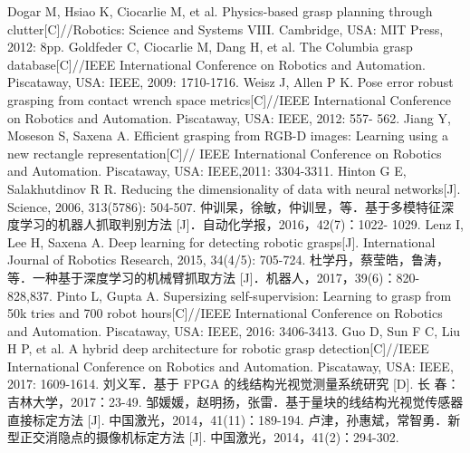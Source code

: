 \documentclass[no-math,bwprint]{YangThesis}
\begin{document}
\begin{thebibliography}{9}
 Dogar M, Hsiao K, Ciocarlie M, et al. Physics-based grasp planning through clutter[C]//Robotics: Science and Systems VIII. Cambridge, USA: MIT Press, 2012: 8pp.
 Goldfeder C, Ciocarlie M, Dang H, et al. The Columbia grasp database[C]//IEEE International Conference on Robotics and Automation. Piscataway, USA: IEEE, 2009: 1710-1716.
 Weisz J, Allen P K. Pose error robust grasping from contact wrench space metrics[C]//IEEE International Conference on Robotics and Automation. Piscataway, USA: IEEE, 2012: 557- 562.
   Jiang Y, Moseson S, Saxena A. Efficient grasping from RGB-D images: Learning using a new rectangle representation[C]// IEEE International Conference on Robotics and Automation. Piscataway, USA: IEEE,2011: 3304-3311.
  Hinton G E, Salakhutdinov R R. Reducing the dimensionality of data with neural networks[J]. Science, 2006, 313(5786): 504-507.
   仲训杲，徐敏，仲训昱，等．基于多模特征深度学习的机器人抓取判别方法 [J]．自动化学报，2016，42(7)：1022- 1029.
 Lenz I, Lee H, Saxena A. Deep learning for detecting robotic grasps[J]. International Journal of Robotics Research, 2015, 34(4/5): 705-724.
   杜学丹，蔡莹皓，鲁涛，等．一种基于深度学习的机械臂抓取方法  [J]．机器人，2017，39(6)：820-828,837.
 Pinto L, Gupta A. Supersizing self-supervision: Learning to grasp from 50k tries and 700 robot hours[C]//IEEE International Conference on Robotics and Automation. Piscataway, USA: IEEE, 2016: 3406-3413.
 Guo D, Sun F C, Liu H P, et al. A hybrid deep architecture for robotic grasp detection[C]//IEEE International Conference on Robotics and Automation. Piscataway, USA: IEEE, 2017: 1609-1614.
 刘义军．基于 FPGA 的线结构光视觉测量系统研究 [D]. 长 春：吉林大学，2017：23-49.
 邹媛媛，赵明扬，张雷．基于量块的线结构光视觉传感器直接标定方法 [J]. 中国激光，2014，41(11)：189-194.
 卢津，孙惠斌，常智勇．新型正交消隐点的摄像机标定方法 [J]. 中国激光，2014，41(2)：294-302.


\end{thebibliography}
\end{document}
